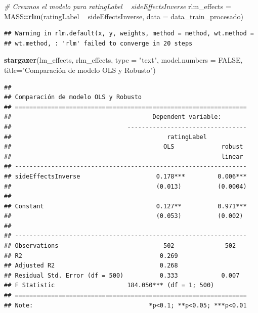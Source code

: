 \documentclass[spanish,]{article}
\newenvironment{Shaded}{\begin{snugshade}}{\end{snugshade}}
\newcommand{\KeywordTok}[1]{\textcolor[rgb]{0.13,0.29,0.53}{\textbf{#1}}}
\newcommand{\DataTypeTok}[1]{\textcolor[rgb]{0.13,0.29,0.53}{#1}}
\newcommand{\StringTok}[1]{\textcolor[rgb]{0.31,0.60,0.02}{#1}}
\newcommand{\CommentTok}[1]{\textcolor[rgb]{0.56,0.35,0.01}{\textit{#1}}}
\newcommand{\OtherTok}[1]{\textcolor[rgb]{0.56,0.35,0.01}{#1}}
\newcommand{\OperatorTok}[1]{\textcolor[rgb]{0.81,0.36,0.00}{\textbf{#1}}}
\newcommand{\NormalTok}[1]{#1}
\begin{document}
\begin{Shaded}
\begin{Highlighting}[]
\CommentTok{# Creamos el modelo para ratingLabel ~ sideEffectsInverse}
\NormalTok{rlm_effects =}\StringTok{ }\NormalTok{MASS}\OperatorTok{::}\KeywordTok{rlm}\NormalTok{(ratingLabel }\OperatorTok{~}\StringTok{ }\NormalTok{sideEffectsInverse, }\DataTypeTok{data =}\NormalTok{ data_train_procesado)}
\end{Highlighting}
\end{Shaded}

\begin{verbatim}
## Warning in rlm.default(x, y, weights, method = method, wt.method =
## wt.method, : 'rlm' failed to converge in 20 steps
\end{verbatim}

\begin{Shaded}
\begin{Highlighting}[]
\KeywordTok{stargazer}\NormalTok{(lm_effects, rlm_effects, }\DataTypeTok{type =} \StringTok{"text"}\NormalTok{, }\DataTypeTok{model.numbers =} \OtherTok{FALSE}\NormalTok{, }
          \DataTypeTok{title=}\StringTok{"Comparación de modelo OLS y Robusto"}\NormalTok{)}
\end{Highlighting}
\end{Shaded}

\begin{verbatim}
## 
## Comparación de modelo OLS y Robusto
## ================================================================
##                                       Dependent variable:       
##                                ---------------------------------
##                                           ratingLabel           
##                                          OLS             robust 
##                                                          linear 
## ----------------------------------------------------------------
## sideEffectsInverse                     0.178***         0.006***
##                                        (0.013)          (0.0004)
##                                                                 
## Constant                               0.127**          0.971***
##                                        (0.053)          (0.002) 
##                                                                 
## ----------------------------------------------------------------
## Observations                             502              502   
## R2                                      0.269                   
## Adjusted R2                             0.268                   
## Residual Std. Error (df = 500)          0.333            0.007  
## F Statistic                    184.050*** (df = 1; 500)         
## ================================================================
## Note:                                *p<0.1; **p<0.05; ***p<0.01
\end{verbatim}
\end{document}
